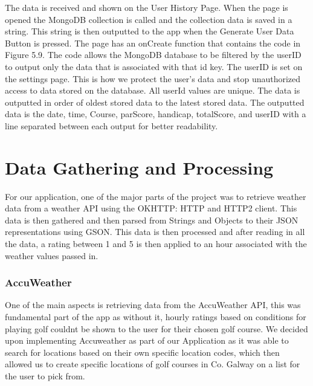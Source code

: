 The data is received and shown on the User History Page. When the page is opened the MongoDB collection is called and the collection data is saved in a string. This string is then outputted to the app when the Generate User Data Button is pressed. \newline
The page has an onCreate function that contains the code in Figure 5.9. The code allows the MongoDB database to be filtered by the userID to output only the data that is associated with that id key. The userID is set on the settings page. This is how we protect the user's data and stop unauthorized access to data stored on the database. All userId values are unique. The data is outputted in order of oldest stored data to the latest stored data. The outputted data is the date, time, Course, parScore, handicap, totalScore, and userID with a line separated between each output for better readability.

\section{Data Gathering and Processing}
For our application, one of the major parts of the project was to retrieve weather data from a weather API using the OKHTTP: HTTP and HTTP2 client. This data is then gathered and then parsed from Strings and Objects to their JSON representations using GSON. This data is then processed and after reading in all the data, a rating between 1 and 5 is then applied to an hour associated with the weather values passed in.

\subsubsection{AccuWeather}
One of the main aspects is retrieving data from the AccuWeather API, this was fundamental part of the app as without it, hourly ratings based on conditions for playing golf couldnt be shown to the user for their chosen golf course. We decided upon implementing Accuweather as part of our Application as it was able to search for locations based on their own specific location codes, which then allowed us to create specific locations of golf courses in Co. Galway on a list for the user to pick from.

